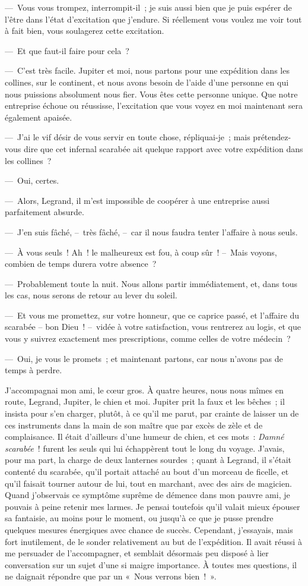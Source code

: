 \documentclass[french,twoside]{book} %
\begin{document}
— Vous vous trompez, interrompit-il ; je suis aussi bien que je puis espérer de l’être dans l’état d’excitation que j’endure. Si réellement vous voulez me voir tout à fait bien, vous soulagerez cette excitation.\par
— Et que faut-il faire pour cela ?\par
— C’est très facile. Jupiter et moi, nous partons pour une expédition dans les collines, sur le continent, et nous avons besoin de l’aide d’une personne en qui nous puissions absolument nous fier. Vous êtes cette personne unique. Que notre entreprise échoue ou réussisse, l’excitation que vous voyez en moi maintenant sera également apaisée.\par
— J’ai le vif désir de vous servir en toute chose, répliquai-je ; mais prétendez-vous dire que cet infernal scarabée ait quelque rapport avec votre expédition dans les collines ?\par
— Oui, certes.\par
— Alors, Legrand, il m’est impossible de coopérer à une entreprise aussi parfaitement absurde.\par
— J’en suis fâché, – très fâché, – car il nous faudra tenter l’affaire à nous seuls.\par
— À vous seuls ! Ah ! le malheureux est fou, à coup sûr ! – Mais voyons, combien de temps durera votre absence ?\par
— Probablement toute la nuit. Nous allons partir immédiatement, et, dans tous les cas, nous serons de retour au lever du soleil.\par
— Et vous me promettez, sur votre honneur, que ce caprice passé, et l’affaire du scarabée – bon Dieu ! – vidée à votre satisfaction, vous rentrerez au logis, et que vous y suivrez exactement mes prescriptions, comme celles de votre médecin ?\par
— Oui, je vous le promets ; et maintenant partons, car nous n’avons pas de temps à perdre.\par
J’accompagnai mon ami, le cœur gros. À quatre heures, nous nous mîmes en route, Legrand, Jupiter, le chien et moi. Jupiter prit la faux et les bêches ; il insista pour s’en charger, plutôt, à ce qu’il me parut, par crainte de laisser un de ces instruments dans la main de son maître que par excès de zèle et de complaisance. Il était d’ailleurs d’une humeur de chien, et ces mots : \emph{Damné scarabée} ! furent les seuls qui lui échappèrent tout le long du voyage. J’avais, pour ma part, la charge de deux lanternes sourdes ; quant à Legrand, il s’était contenté du scarabée, qu’il portait attaché au bout d’un morceau de ficelle, et qu’il faisait tourner autour de lui, tout en marchant, avec des airs de magicien. Quand j’observais ce symptôme suprême de démence dans mon pauvre ami, je pouvais à peine retenir mes larmes. Je pensai toutefois qu’il valait mieux épouser sa fantaisie, au moins pour le moment, ou jusqu’à ce que je pusse prendre quelques mesures énergiques avec chance de succès. Cependant, j’essayais, mais fort inutilement, de le sonder relativement au but de l’expédition. Il avait réussi à me persuader de l’accompagner, et semblait désormais peu disposé à lier conversation sur un sujet d’une si maigre importance. À toutes mes questions, il ne daignait répondre que par un « Nous verrons bien ! ».\par
\end{document}

